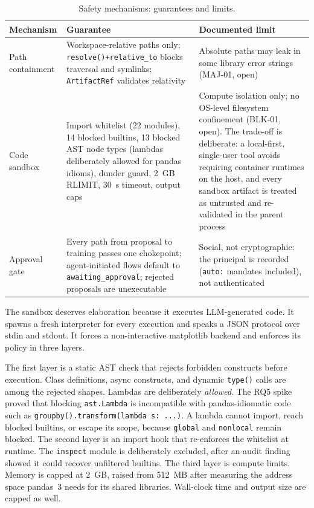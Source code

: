 \begin{table}[H]
\centering
\caption{Safety mechanisms: guarantees and limits.}
\label{tab:safety}
\small
\begin{tabular}{p{3.1cm}p{6.2cm}p{5.1cm}}
\toprule
\textbf{Mechanism} & \textbf{Guarantee} & \textbf{Documented limit} \\
\midrule
Path containment & Workspace-relative paths only; \texttt{resolve()+relative\_to} blocks traversal and symlinks; \texttt{ArtifactRef} validates relativity & Absolute paths may leak in some library error strings (MAJ-01, open) \\
Code sandbox & Import whitelist (22 modules), 14 blocked builtins, 13 blocked AST node types (lambdas deliberately allowed for pandas idioms), dunder guard, 2~GB RLIMIT, 30~s timeout, output caps & Compute isolation only; no OS-level filesystem confinement (BLK-01, open). The trade-off is deliberate: a local-first, single-user tool avoids requiring container runtimes on the host, and every sandbox artifact is treated as untrusted and re-validated in the parent process \\
Approval gate & Every path from proposal to training passes one chokepoint; agent-initiated flows default to \texttt{awaiting\_approval}; rejected proposals are unexecutable & Social, not cryptographic: the principal is recorded (\texttt{auto:} mandates included), not authenticated \\
\bottomrule
\end{tabular}
\end{table}

The sandbox deserves elaboration because it executes LLM-generated code. It spawns a fresh interpreter for every execution and speaks a JSON protocol over stdin and stdout. It forces a non-interactive matplotlib backend and enforces its policy in three layers.

The first layer is a static AST check that rejects forbidden constructs before execution. Class definitions, async constructs, and dynamic \texttt{type()} calls are among the rejected shapes. Lambdas are deliberately \emph{allowed}. The RQ5 spike proved that blocking \texttt{ast.Lambda} is incompatible with pandas-idiomatic code such as \texttt{groupby().transform(lambda s: ...)}. A lambda cannot import, reach blocked builtins, or escape its scope, because \texttt{global} and \texttt{nonlocal} remain blocked. The second layer is an import hook that re-enforces the whitelist at runtime. The \texttt{inspect} module is deliberately excluded, after an audit finding showed it could recover unfiltered builtins. The third layer is compute limits. Memory is capped at 2~GB, raised from 512~MB after measuring the address space pandas~3 needs for its shared libraries. Wall-clock time and output size are capped as well.

